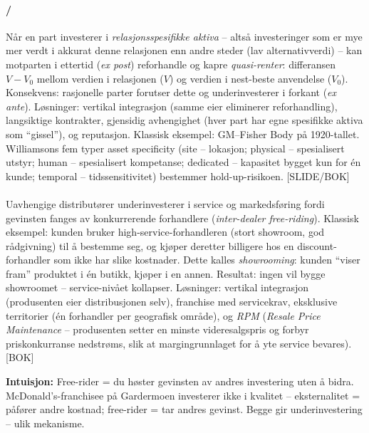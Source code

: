\paragraph{\quad\SOne/\SThree}
Når en part investerer i \emph{relasjonsspesifikke aktiva} -- altså investeringer som er mye mer verdt i akkurat denne relasjonen enn andre steder (lav alternativverdi) -- kan motparten i ettertid (\emph{ex post}) reforhandle og kapre \emph{quasi-renter}: differansen $V - V_0$ mellom verdien i relasjonen ($V$) og verdien i nest-beste anvendelse ($V_0$). Konsekvens: rasjonelle parter forutser dette og underinvesterer i forkant (\emph{ex ante}). Løsninger: vertikal integrasjon (samme eier eliminerer reforhandling), langsiktige kontrakter, gjensidig avhengighet (hver part har egne spesifikke aktiva som ``gissel''), og reputasjon. Klassisk eksempel: GM--Fisher Body på 1920-tallet. Williamsons fem typer asset specificity (site -- lokasjon; physical -- spesialisert utstyr; human -- spesialisert kompetanse; dedicated -- kapasitet bygget kun for én kunde; temporal -- tidssensitivitet) bestemmer hold-up-risikoen. [SLIDE/BOK]

\paragraph{\quad\SThree}
Uavhengige distributører underinvesterer i service og markedsføring fordi gevinsten fanges av konkurrerende forhandlere (\emph{inter-dealer free-riding}). Klassisk eksempel: kunden bruker high-service-forhandleren (stort showroom, god rådgivning) til å bestemme seg, og kjøper deretter billigere hos en discount-forhandler som ikke har slike kostnader. Dette kalles \emph{showrooming}: kunden ``viser fram'' produktet i én butikk, kjøper i en annen. Resultat: ingen vil bygge showroomet -- service-nivået kollapser. Løsninger: vertikal integrasjon (produsenten eier distribusjonen selv), franchise med servicekrav, eksklusive territorier (én forhandler per geografisk område), og \emph{RPM} (\emph{Resale Price Maintenance} -- produsenten setter en minste videresalgspris og forbyr priskonkurranse nedstrøms, slik at margingrunnlaget for å yte service bevares). [BOK]

\begin{tcolorbox}[colback=blue!4, colframe=blue!50!black, boxrule=0.4pt, arc=2pt, left=6pt, right=6pt, top=4pt, bottom=4pt]
\textbf{Intuisjon:} Free-rider = du høster gevinsten av andres investering uten å bidra. McDonald's-franchisee på Gardermoen investerer ikke i kvalitet -- eksternalitet = påfører andre kostnad; free-rider = tar andres gevinst. Begge gir underinvestering -- ulik mekanisme.
\end{tcolorbox}

